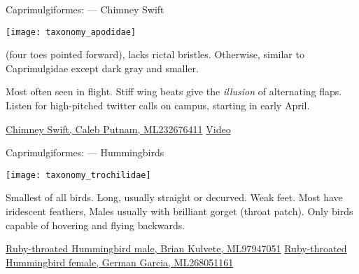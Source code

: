 \documentclass[t]{beamer}
\begin{document}
\begin{frame}[t]{Caprimulgiformes:  — Chimney Swift}

\vspace{-\baselineskip}

\begin{multicols}{2}
\texttt{[image: taxonomy\_apodidae]}

\columnbreak

 (four toes pointed forward), lacks rictal bristles. Otherwise, similar to Caprimulgidae except dark gray and smaller. 

\vspace{\baselineskip}

Most often seen in flight. Stiff wing beats give the \textit{illusion} of alternating flaps. Listen for high-pitched twitter calls on campus, starting in early April.
\end{multicols}

\vfilll

\tiny \href{https://macaulaylibrary.org/asset/232676411}{Chimney Swift, Caleb Putnam, ML232676411} \qquad  \href{https://www.allaboutbirds.org/guide/Chimney_Swift/photo-gallery/440546}{Video}

\end{frame}

\begin{frame}[t]{Caprimulgiformes:  — Hummingbirds}
\vspace{-0.5\baselineskip}


\texttt{[image: taxonomy\_trochilidae]}

\hangpara Smallest of all birds. Long,  usually straight or decurved. Weak feet. Most have iridescent feathers, Males usually with brilliant gorget (throat patch). Only birds capable of hovering and flying backwards.

\vfilll

\tiny \href{https://macaulaylibrary.org/asset/97947051}{Ruby-throated Hummingbird male, Brian Kulvete, ML97947051} \hfill  \href{https://macaulaylibrary.org/asset/268051161}{Ruby-throated Hummingbird female, German Garcia, ML268051161}

\end{frame}
\end{document}
